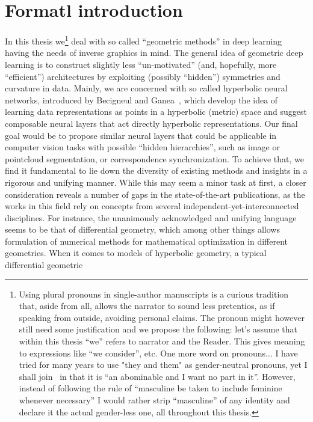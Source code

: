 \section*{Formatl introduction}

In this thesis we\footnote{
Using plural pronouns in single-author manuscripts is a curious tradition that,
aside from all, allows the narrator to sound less pretentios, as if speaking
from outside, avoiding personal claims. The pronoun might however still need
some justification and we propose the following: let's assume that within this
thesis ``we'' refers to narrator and the Reader. This gives meaning to
expressions like ``we consider'', etc.  One more word on pronouns...
I have tried for many years to use "they and
them" as gender-neutral pronouns, yet I shall join~\cite{strictlyEnglish} in
that it is ``an abominable and I want no part in it''.  However, instead of
following the rule of ``masculine be taken to include feminine whenever
necessary'' I would rather strip ``masculine'' of any identity and declare it
the actual gender-less one, all throughout this thesis.}
deal with so called ``geometric methods'' in deep learning having the needs of
inverse graphics in mind. The general idea of geometric deep learning is to
construct slightly less ``un-motivated'' (and, hopefully, more ``efficient'')
architectures by exploiting (possibly ``hidden'') symmetries and curvature in
data. Mainly, we are concerned with so called hyperbolic neural networks,
introduced by Becigneul and Ganea~\cite{ganeaHNNs}, which develop the idea of
learning data representations as points in a hyperbolic (metric) space and
suggest composable neural layers that act directly hyperbolic representations.
Our final goal would be to propose similar neural layers that could be
applicable in computer vision tasks with possible ``hidden hierarchies'', such
as image or pointcloud segmentation, or correspondence synchronization. To
achieve that, we find it fundamental to lie down the diversity of existing
methods and insights in a rigorous and unifying manner. While this may seem a
minor task at first, a closer consideration reveals a number of gaps in the
state-of-the-art publications, as the works in this field rely on concepts from
several independent-yet-interconnected disciplines. For instance, the
unanimously acknowledged and unifying language seems to be that of differential
geometry, which among other things allows formulation of numerical methods for
mathematical optimization in different geometries. When it comes to models of
hyperbolic geometry, a typical differential geometric
